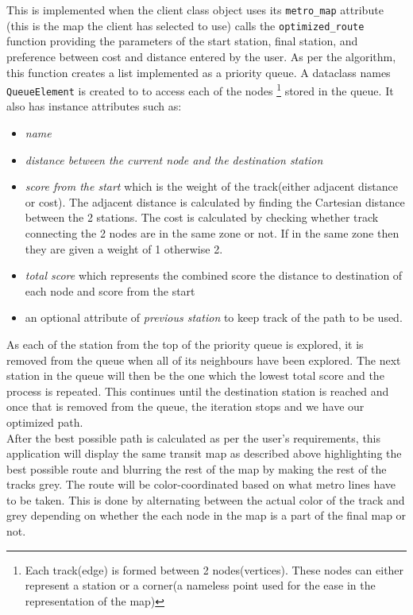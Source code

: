 \documentclass[fontsize=11pt]{article}
\begin{document}
    This is implemented when the client class object uses its \texttt{metro\_map} attribute (this is the map the client has selected to use) calls the \texttt{optimized\_route} function providing the parameters of the start station, final station, and preference between cost and distance entered by the user. As per the algorithm, this function creates a list implemented as a priority queue. A dataclass names \texttt{QueueElement} is created to to access each of the nodes \footnote{Each track(edge) is formed between 2 nodes(vertices). These nodes can either represent a station or a corner(a nameless point used for the ease in the representation of the map)} stored in the queue. It also has instance attributes such as:
    \begin{itemize}
        \item  \textit{name}
        \item \textit{distance between the current node and the destination station }
        \item \textit{score from the start} which is the weight of the track(either adjacent distance or cost). The adjacent distance is calculated by finding the Cartesian distance between the 2 stations. The cost is calculated by checking whether track connecting the 2 nodes are in the same zone or not. If in the same zone then they are given a weight of 1 otherwise 2.
        \item \textit{total score} which represents the combined score the distance to destination of each node and score from the start
        \item an optional attribute of \textit{previous station} to keep track of the path to be used.
    \end{itemize}
    As each of the station from the top of the priority queue is explored, it is removed from the queue when all of its neighbours have been explored. The next station in the queue will then be the one which the lowest total score and the process is repeated. This continues until the destination station is reached and once that is removed from the queue, the iteration stops and we have our optimized path.
    \\
    After the best possible path is calculated as per the user's requirements, this application will display the same transit map as described above highlighting the best possible route and blurring the rest of the map by making the rest of the tracks grey. The route will be color-coordinated based on what metro lines have to be taken. This is done by alternating between the actual color of the track and grey depending on whether the each node in the map is a part of the final map or not.
\end{document}
